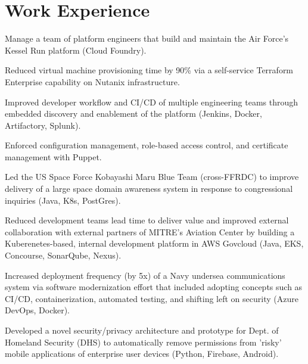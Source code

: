 \documentclass[]{deedy-resume-openfont}
\begin{document}
\section{Work Experience}
\hfill {}
\begin{tightemize}
	\item Manage a team of platform engineers that build and maintain the Air Force's Kessel Run platform (Cloud Foundry).
\end{tightemize}
\sectionsep
{}\hfill {}
\begin{tightemize}
	\item Reduced virtual machine provisioning time by 90\% via a self-service Terraform Enterprise capability on Nutanix infrastructure.
	\item Improved developer workflow and CI/CD of multiple engineering teams through embedded discovery and enablement of the platform (Jenkins, Docker, Artifactory, Splunk).
	\item Enforced configuration management, role-based access control, and certificate management with Puppet.
\end{tightemize}
\sectionsep
{}\hfill {}
\begin{tightemize}
	\item Led the US Space Force Kobayashi Maru Blue Team (cross-FFRDC) to improve delivery of a large space domain awareness system in response to congressional inquiries (Java, K8s, PostGres).
	\item Reduced development teams lead time to deliver value and improved external collaboration with external partners of MITRE's Aviation Center by building a Kuberenetes-based, internal development platform in AWS Govcloud (Java, EKS, Concourse, SonarQube, Nexus).
    \item Increased deployment frequency (by 5x) of a Navy undersea communications system via software modernization effort that included adopting concepts such as CI/CD, containerization, automated testing, and shifting left on security (Azure DevOps, Docker).
	\item Developed a novel security/privacy architecture and prototype for Dept. of Homeland Security (DHS) to automatically remove permissions from 'risky' mobile applications of enterprise user devices (Python, Firebase, Android).
\end{tightemize}
\end{document}
